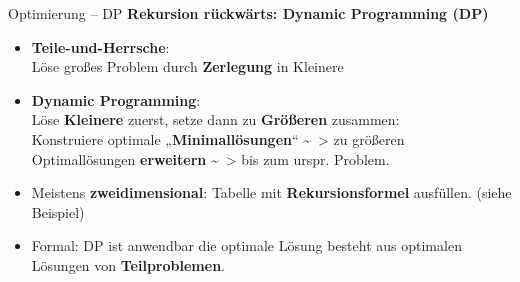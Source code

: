 \begin{frame}{Optimierung – DP}
	\textbf{Rekursion rückwärts: Dynamic Programming (DP)} 
	\begin{itemize}
		\item \textbf{Teile-und-Herrsche}: \\
		Löse großes Problem durch \textbf{Zerlegung} in Kleinere
		\pause
		\item \textbf{Dynamic Programming}: \\
		Löse \textbf{Kleinere} zuerst, setze dann zu \textbf{Größeren} zusammen: \\
		\pause
		\quad Konstruiere optimale „\textbf{Minimallösungen}“ \~~> zu größeren \\ 
		\quad Optimallösungen \textbf{erweitern} \~~> bis zum urspr. Problem.
		\pause
		\item Meistens \textbf{zweidimensional}: Tabelle mit \textbf{Rekursionsformel} ausfüllen. (siehe Beispiel)
		\pause
		\item Formal: DP ist anwendbar \gdw die optimale Lösung besteht aus optimalen Lösungen von \textbf{Teilproblemen}.
	\end{itemize}
\end{frame}


